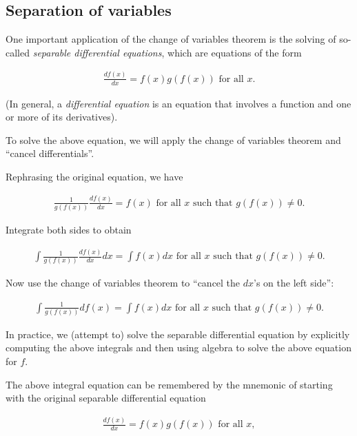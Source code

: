\subsection*{Separation of variables}

One important application of the change of variables theorem is the solving of so-called \textit{separable differential equations}, which are equations of the form 

\begin{align*}
    \frac{df(x)}{dx} = f(x) g(f(x)) \text{ for all $x$}.
\end{align*}

(In general, a \textit{differential equation} is an equation that involves a function and one or more of its derivatives).

To solve the above equation, we will apply the change of variables theorem and ``cancel differentials''.

Rephrasing the original equation, we have

\begin{align*}
    \frac{1}{g(f(x))} \frac{df(x)}{dx} = f(x) \text{ for all $x$ such that $g(f(x)) \neq 0$}.
\end{align*}

Integrate both sides to obtain

\begin{align*}
    \int \frac{1}{g(f(x))} \frac{df(x)}{dx} dx = \int f(x) dx \text{ for all $x$ such that $g(f(x)) \neq 0$}.
\end{align*}
 
Now use the change of variables theorem to ``cancel the $dx$'s on the left side'':

\begin{align*}
    \boxed
    {
        \int \frac{1}{g(f(x))} df(x) = \int f(x) dx \text{ for all $x$ such that $g(f(x)) \neq 0$}.
    }
\end{align*}

In practice, we (attempt to) solve the separable differential equation by explicitly computing the above integrals and then using algebra to solve the above equation for $f$.

The above integral equation can be remembered by the mnemonic of starting with the original separable differential equation

\begin{align*}
    \frac{df(x)}{dx} = f(x) g(f(x)) \text{ for all $x$},
\end{align*}

